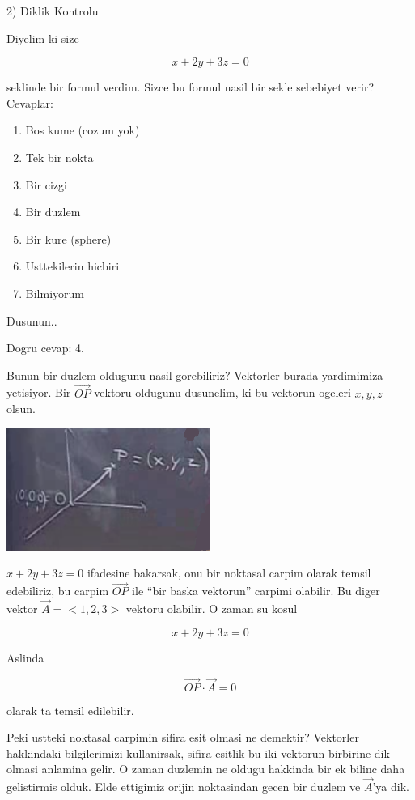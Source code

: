 \documentclass[12pt,fleqn]{article}
\begin{document}
2) Diklik Kontrolu

Diyelim ki size 

\[ x + 2y + 3z = 0 \]

seklinde bir formul verdim. Sizce bu formul nasil bir sekle sebebiyet
verir? Cevaplar:

\begin{enumerate}
   \item Bos kume (cozum yok)
   \item Tek bir nokta
   \item Bir cizgi
   \item Bir duzlem
   \item Bir kure (sphere)
   \item Usttekilerin hicbiri
   \item Bilmiyorum
\end{enumerate}

Dusunun.. 

Dogru cevap: 4. 

Bunun bir duzlem oldugunu nasil gorebiliriz? Vektorler burada yardimimiza
yetisiyor. Bir $\vec{OP}$ vektoru oldugunu dusunelim, ki bu vektorun
ogeleri $x,y,z$ olsun. 

\includegraphics[height=4cm]{1_14.png}

$x + 2y + 3z = 0$ ifadesine bakarsak, onu bir noktasal carpim olarak temsil
edebiliriz, bu carpim $\vec{OP}$ ile ``bir baska vektorun'' carpimi
olabilir. Bu diger vektor $\vec{A} = <1,2,3>$ vektoru olabilir. O zaman su kosul

\[ x + 2y + 3z = 0 \]

Aslinda

\[ \vec{OP} \cdot \vec{A} = 0 \]

olarak ta temsil edilebilir.

Peki ustteki noktasal carpimin sifira esit olmasi ne demektir? Vektorler
hakkindaki bilgilerimizi kullanirsak, sifira esitlik bu iki vektorun
birbirine dik olmasi anlamina gelir. O zaman duzlemin ne oldugu hakkinda
bir ek bilinc daha gelistirmis olduk. Elde ettigimiz orijin noktasindan
gecen bir duzlem ve $\vec{A}$'ya dik. 
\end{document}
